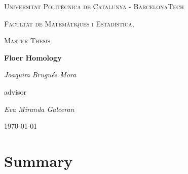 \documentclass[a4paper,11pt]{book}
\begin{document}
\begin{titlepage}
	\centering
	{\scshape\LARGE Universitat Politècnica de Catalunya - BarcelonaTech\par}
	{\scshape\LARGE Facultat de Matemàtiques i Estadística, \par}
	\vspace{1cm}
	{\scshape\Large Master Thesis\par}
	\vspace{1.5cm}
	{\huge\bfseries Floer Homology\par}
	\vspace{2cm}
	{\Large\itshape Joaquim Brugués Mora\par}
	\vfill
	advisor\par
	{\Large\itshape Eva Miranda Galceran\par}

	\vfill

	{\large \today\par}
\end{titlepage}


\chapter*{Summary}


\tableofcontents

\mainmatter


\end{document}

